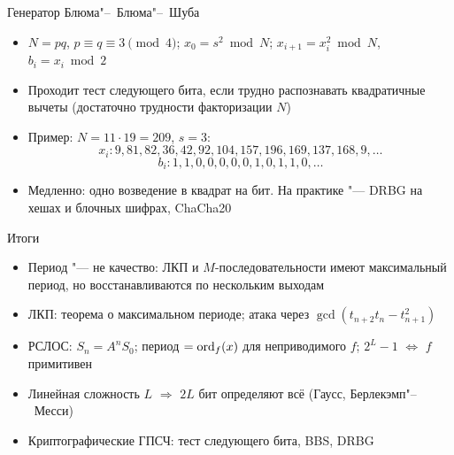 \documentclass{ca-slides}
\begin{document}
\begin{canvasframe}{Генератор Блюма"--~Блюма"--~Шуба}
  \begin{itemize}
    \item $N = pq$, $p \equiv q \equiv 3 \pmod 4$; $x_0 = s^2 \bmod N$;
      \quad $x_{i+1} = x_i^2 \bmod N$, \quad $b_i = x_i \bmod 2$
    \item Проходит тест следующего бита, если трудно распознавать квадратичные вычеты
      (достаточно трудности факторизации $N$)
    \item Пример: $N = 11 \cdot 19 = 209$, $s = 3$:
      \[x_i: 9, 81, 82, 36, 42, 92, 104, 157, 196, 169, 137, 168, 9, \dots\]
      \[b_i: 1, 1, 0, 0, 0, 0, 0, 1, 0, 1, 1, 0, \dots\]
    \item Медленно: одно возведение в квадрат на бит. На практике "--- DRBG на хешах
      и блочных шифрах, ChaCha20
  \end{itemize}
\end{canvasframe}

\begin{canvasframe}{Итоги}
  \begin{itemize}
    \item Период "--- не качество: ЛКП и $M$-последовательности имеют максимальный период, но
      восстанавливаются по нескольким выходам
    \item ЛКП: теорема о максимальном периоде; атака через $\gcd(t_{n+2} t_n - t_{n+1}^2)$
    \item РСЛОС: $S_n = A^n S_0$; период $= \operatorname{ord}_f(x)$ для неприводимого $f$;
      $2^L - 1$ $\iff$ $f$ примитивен
    \item Линейная сложность $L$ $\Rightarrow$ $2L$ бит определяют всё (Гаусс, Берлекэмп"--~Месси)
    \item Криптографические ГПСЧ: тест следующего бита, BBS, DRBG
  \end{itemize}
\end{canvasframe}
\end{document}
